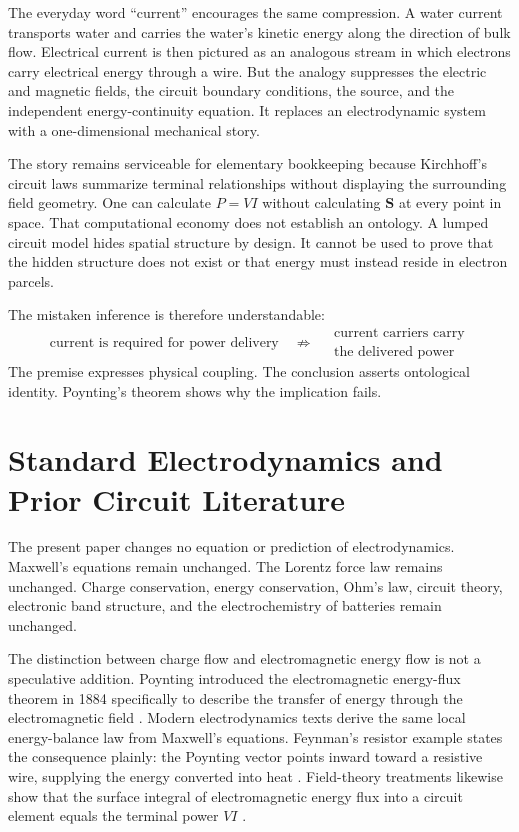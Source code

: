 \documentclass[12pt,onecolumn]{article}
\begin{document}
The everyday word ``current'' encourages the same compression. A water current transports water and carries the water's kinetic energy along the direction of bulk flow. Electrical current is then pictured as an analogous stream in which electrons carry electrical energy through a wire. But the analogy suppresses the electric and magnetic fields, the circuit boundary conditions, the source, and the independent energy-continuity equation. It replaces an electrodynamic system with a one-dimensional mechanical story.

The story remains serviceable for elementary bookkeeping because Kirchhoff's circuit laws summarize terminal relationships without displaying the surrounding field geometry. One can calculate $P=VI$ without calculating $\mathbf S$ at every point in space. That computational economy does not establish an ontology. A lumped circuit model hides spatial structure by design. It cannot be used to prove that the hidden structure does not exist or that energy must instead reside in electron parcels.

The mistaken inference is therefore understandable:
\[
\text{current is required for power delivery}
\quad\nRightarrow\quad
\begin{array}{c}
\text{current carriers carry}\\
\text{the delivered power}
\end{array}
\]
The premise expresses physical coupling. The conclusion asserts ontological identity. Poynting's theorem shows why the implication fails.


\section{Standard Electrodynamics and Prior Circuit Literature}

The present paper changes no equation or prediction of electrodynamics. Maxwell's equations remain unchanged. The Lorentz force law remains unchanged. Charge conservation, energy conservation, Ohm's law, circuit theory, electronic band structure, and the electrochemistry of batteries remain unchanged.

The distinction between charge flow and electromagnetic energy flow is not a speculative addition. Poynting introduced the electromagnetic energy-flux theorem in 1884 specifically to describe the transfer of energy through the electromagnetic field \cite{poynting1884}. Modern electrodynamics texts derive the same local energy-balance law from Maxwell's equations. Feynman's resistor example states the consequence plainly: the Poynting vector points inward toward a resistive wire, supplying the energy converted into heat \cite{feynman}. Field-theory treatments likewise show that the surface integral of electromagnetic energy flux into a circuit element equals the terminal power $VI$ \cite{hausmelcher}.
\end{document}
